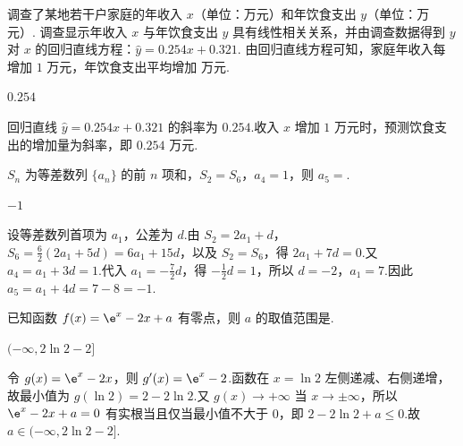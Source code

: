 \begin{problem}
调查了某地若干户家庭的年收入 \(x\)（单位：万元）和年饮食支出 \(y\)（单位：万元）. 调查显示年收入 \(x\) 与年饮食支出 \(y\) 具有线性相关关系，并由调查数据得到 \(y\) 对 \(x\) 的回归直线方程：\(\hat{y} = 0.254x + 0.321\). 由回归直线方程可知，家庭年收入每增加 \(1\) 万元，年饮食支出平均增加\fillinblank{} 万元.
\end{problem}

\begin{answer}
\(0.254\)
\end{answer}

\begin{solution}
回归直线 \(\hat y=0.254x+0.321\) 的斜率为 \(0.254\).收入 \(x\) 增加 \(1\) 万元时，预测饮食支出的增加量为斜率，即 \(0.254\) 万元.
\end{solution}

\begin{problem}
\(S_{n}\) 为等差数列 \(\{a_{n}\}\) 的前 \(n\) 项和，\(S_{2} = S_{6}\)，\(a_{4} = 1\)，则 \(a_{5} =\)\fillinblank{}.
\end{problem}

\begin{answer}
\(-1\)
\end{answer}

\begin{solution}
设等差数列首项为 \(a_1\)，公差为 \(d\).由
\(\displaystyle S_2=2a_1+d\)，
\(\displaystyle S_6=\frac62(2a_1+5d)=6a_1+15d\)，以及 \(S_2=S_6\)，得
\(\displaystyle 2a_1+7d=0\).又 \(a_4=a_1+3d=1\).代入 \(a_1=-\tfrac72d\)，得 \(-\tfrac12d=1\)，所以 \(d=-2\)，\(a_1=7\).因此 \(a_5=a_1+4d=7-8=-1\).
\end{solution}

\begin{problem}
已知函数 \(f(x) = \e^{x} - 2x + a\) 有零点，则 \(a\) 的取值范围是\fillinblank{}.
\end{problem}

\begin{answer}
\((-\infty,2\ln 2-2]\)
\end{answer}

\begin{solution}
令 \(g(x)=\e^x-2x\)，则 \(g'(x)=\e^x-2\).函数在 \(x=\ln2\) 左侧递减、右侧递增，故最小值为
\(\displaystyle g(\ln2)=2-2\ln2\).又 \(g(x)\to+\infty\) 当 \(x\to\pm\infty\)，所以 \(\e^x-2x+a=0\) 有实根当且仅当最小值不大于 \(0\)，即
\(\displaystyle 2-2\ln2+a\leq0\).故 \(a\in(-\infty,2\ln2-2]\).
\end{solution}

